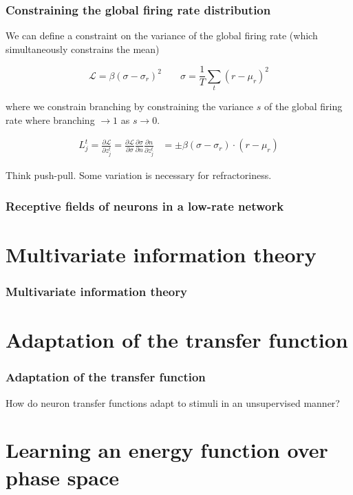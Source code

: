 \documentclass{beamer}
\begin{document}
\begin{frame}[plain]
\frametitle{Constraining the global firing rate distribution} 

We can define a constraint on the variance of the global firing rate (which simultaneously constrains the mean)

\begin{equation*}
\mathcal{L} = \beta(\sigma- \sigma_{r})^{2}
\;\;\;\;\;\;\; \sigma = \frac{1}{T}\sum_{t} (r - \mu_{r})^{2}
\end{equation*}

where we constrain branching by constraining the variance $s$ of the global firing rate where branching $\rightarrow 1$ as $s \rightarrow 0$.  

\begin{align*}
L_{j}^{t} = \frac{\partial \mathcal{L}}{\partial z_{j}^{t}} = \frac{\partial \mathcal{L}}{\partial \sigma}\frac{\partial \sigma}{\partial n} \frac{\partial n}{\partial z_{j}^{t}}
&= \pm \beta (\sigma- \sigma_{r}) \cdot (r-\mu_{r}) 
\end{align*}

Think push-pull. Some variation is necessary for refractoriness.

\end{frame}


\begin{frame}[plain]
\frametitle{Receptive fields of neurons in a low-rate network} 


\end{frame}

\section{Multivariate information theory} 

\begin{frame}[plain]
\frametitle{Multivariate information theory} 
\end{frame}

\section{Adaptation of the transfer function} 

\begin{frame}[plain]
\frametitle{Adaptation of the transfer function} 
How do neuron transfer functions adapt to stimuli in an unsupervised manner?
\end{frame}

\section{Learning an energy function over phase space} 
\end{document}
